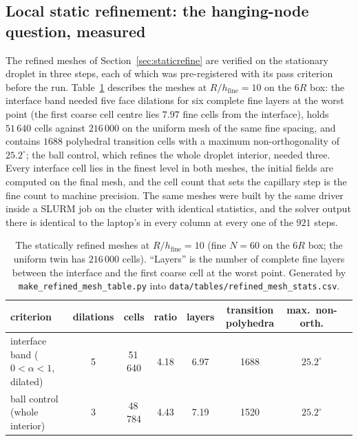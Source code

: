 \documentclass[preprint,3p,11pt]{elsarticle}
\begin{document}
\subsection{Local static refinement: the hanging-node question, measured}
\label{sec:staticrefine-verif}
The refined meshes of Section~\ref{sec:staticrefine} are verified on the stationary
droplet in three steps, each of which was pre-registered with its pass criterion before
the run. Table~\ref{tab:refined-mesh} describes the meshes at $R/h_{\mathrm{fine}}=10$
on the $6R$ box: the interface band needed five face dilations for six complete fine
layers at the worst point (the first coarse cell centre lies $7.97$ fine cells from the
interface), holds $51\,640$ cells against $216\,000$ on the uniform mesh of the same fine
spacing, and contains $1688$ polyhedral transition cells with a maximum non-orthogonality
of $25.2^\circ$; the ball control, which refines the whole droplet interior, needed
three. Every interface cell lies in the finest level in both meshes, the initial
fields are computed on the final mesh, and the cell count that sets the capillary
step is the fine count to machine precision. The same meshes were built by the same
driver inside a SLURM job on the cluster with identical statistics, and the solver
output there is identical to the laptop's in every column at every one of the $921$
steps.

\begin{table}[t]
  \centering
  \caption{The statically refined meshes at $R/h_{\mathrm{fine}}=10$ (fine $N=60$ on the
  $6R$ box; the uniform twin has $216\,000$ cells). ``Layers'' is the number of complete
  fine layers between the interface and the first coarse cell at the worst point.
  Generated by \texttt{make\_refined\_mesh\_table.py} into
  \texttt{data/tables/refined\_mesh\_stats.csv}.}
  \label{tab:refined-mesh}
  \begin{tabular}{lccccccc}
    \hline
    criterion & dilations & cells & ratio & layers & transition polyhedra & max.\ non-orth. \\
    \hline
    interface band ($0<\alpha<1$, dilated) & 5 & 51\,640 & 4.18 & 6.97 & 1688 & $25.2^\circ$ \\
    ball control (whole interior)          & 3 & 48\,784 & 4.43 & 7.19 & 1520 & $25.2^\circ$ \\
    \hline
  \end{tabular}
\end{table}
\end{document}
